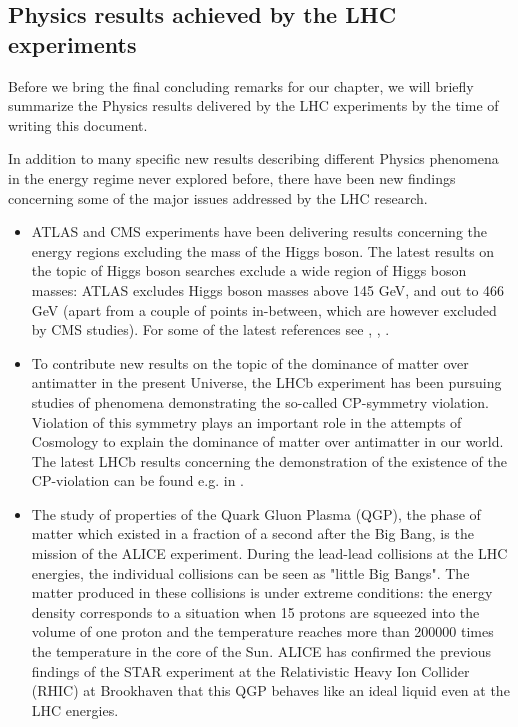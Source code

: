 \subsection{Physics results achieved by the LHC experiments}

Before we bring the final concluding remarks for our chapter, we
will briefly summarize the Physics results delivered by the LHC
experiments by the time of writing this document.

In addition to many specific new results describing different
Physics phenomena in the energy regime never explored before, there
have been new findings concerning some of the major issues addressed
by the LHC research.

\begin{itemize}
\item ATLAS and CMS experiments have been delivering results concerning
the energy regions excluding the mass of the Higgs boson. The latest
results on the topic of Higgs boson searches exclude a wide region
of Higgs boson masses: ATLAS excludes Higgs boson masses above 145
GeV, and out to 466 GeV (apart from a couple of points in-between,
which are however excluded by CMS studies). For some of the latest
references see \cite{higgs}, \cite{higgs2}, \cite{higgs3}.

\item To contribute new results on the topic of the dominance of matter
over antimatter in the present Universe, the LHCb experiment has
been pursuing studies of phenomena demonstrating the so-called
CP-symmetry violation. Violation of this symmetry plays an
important role in the attempts of Cosmology to explain the dominance
of matter over antimatter in our world. The latest LHCb results
concerning the demonstration of the existence of the CP-violation
can be found e.g. in \cite{cpvio}.

\item The study of properties of the Quark Gluon Plasma (QGP), the phase
of matter which existed in a fraction of a second after the Big
Bang, is the mission of the ALICE experiment. During the lead-lead
collisions at the LHC energies, the individual collisions can be
seen as "little Big Bangs". The matter produced in these collisions
is under extreme conditions: the energy density corresponds to a
situation when 15 protons are squeezed into the volume of one proton
and the temperature reaches more than 200000 times the temperature
in the core of the Sun. ALICE has confirmed the previous findings of
the STAR experiment at the Relativistic Heavy Ion Collider (RHIC) at
Brookhaven that this QGP behaves like an ideal liquid \cite{alice_pbpb} even
at the LHC energies.
\end{itemize}

